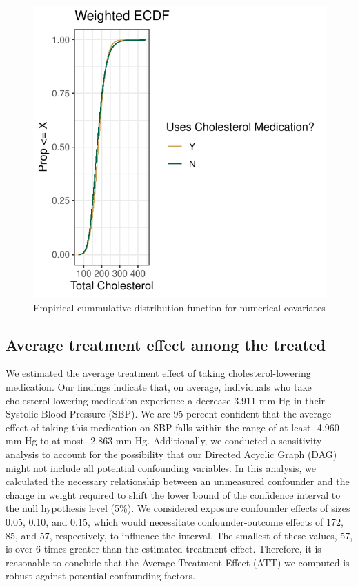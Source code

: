 \documentclass[useAMS,usenatbib,referee]{biom}
\begin{document}
\begin{figure}
\centering
\includegraphics{final-project_files/figure-latex/fig_ecdf-1.pdf}
\caption{Empirical cummulative distribution function for numerical
covariates}
\end{figure}

\hypertarget{average-treatment-effect-among-the-treated}{%
\subsection{Average treatment effect among the
treated}\label{average-treatment-effect-among-the-treated}}

We estimated the average treatment effect of taking cholesterol-lowering
medication. Our findings indicate that, on average, individuals who take
cholesterol-lowering medication experience a decrease 3.911 mm Hg in
their Systolic Blood Pressure (SBP). We are 95 percent confident that
the average effect of taking this medication on SBP falls within the
range of at least -4.960 mm Hg to at most -2.863 mm Hg. Additionally, we
conducted a sensitivity analysis to account for the possibility that our
Directed Acyclic Graph (DAG) might not include all potential confounding
variables. In this analysis, we calculated the necessary relationship
between an unmeasured confounder and the change in weight required to
shift the lower bound of the confidence interval to the null hypothesis
level (5\%). We considered exposure confounder effects of sizes 0.05,
0.10, and 0.15, which would necessitate confounder-outcome effects of
172, 85, and 57, respectively, to influence the interval. The smallest
of these values, 57, is over 6 times greater than the estimated
treatment effect. Therefore, it is reasonable to conclude that the
Average Treatment Effect (ATT) we computed is robust against potential
confounding factors.
\end{document}
